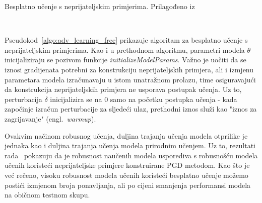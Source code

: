 \documentclass[times, utf8, zavrsni, numeric]{fer}
\begin{document}
\begin{algorithm}
    \caption{Besplatno učenje s neprijateljskim primjerima. Prilagođeno iz~\cite{wong2020fast}}
    \label{algo:adv_learning_free}
    \begin{algorithmic}
        \\\hrulefill
                \ENDFOR
            \ENDFOR
        \ENDFOR
    \end{algorithmic}
\end{algorithm}

\pagebreak

Pseudokod~\ref{algo:adv_learning_free} prikazuje algoritam za besplatno učenje s neprijateljskim primjerima.
Kao i u prethodnom algoritmu, parametri modela $\theta$ inicijaliziraju se pozivom funkcije \textit{initializeModelParams}.
Važno je uočiti da se iznosi gradijenata potrebni za konstrukciju neprijateljskih primjera, ali i izmjenu parametara modela izračunavaju u istom unatražnom prolazu,
time osiguravajući da konstrukcija neprijateljskih primjera ne usporava postupak učenja. 
Uz to, perturbacija $\delta$ inicijalizira se na 0 samo na početku postupka učenja - kada započinje izračun perturbacije za sljedeći ulaz, prethodni iznos služi kao "iznos za zagrijavanje" (engl.\ \textit{warmup}).

Ovakvim načinom robusnog učenja, duljina trajanja učenja modela otprilike je jednaka kao i duljina trajanja učenja modela prirodnim učenjem.
Uz to, rezultati rada~\cite{shafahi2019adversarial} pokazuju da je robusnost naučenih modela usporediva s robusnošću modela učenih koristeći neprijateljske primjere konstruirane PGD metodom.
Kao što je već rečeno, visoku robusnost modela učenih koristeći besplatno učenje možemo postići izmjenom broja ponavljanja, ali po cijeni smanjenja performansi modela na običnom testnom skupu.
\end{document}
